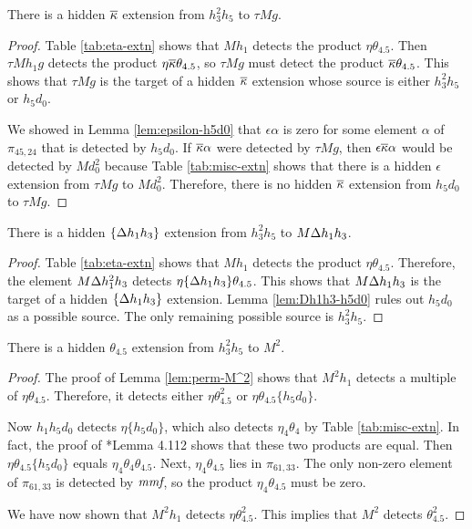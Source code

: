 \begin{lemma}
\label{lem:kappabar-h3^2h5}
There is a hidden $\overline{\kappa}$ extension from $h_3^2 h_5$ to
$\tau M g$.
\end{lemma}

\begin{proof}
Table \ref{tab:eta-extn} shows that
$M h_1$ detects the product $\eta \theta_{4.5}$.
Then $\tau M h_1 g$ detects the product $\eta \overline{\kappa} \theta_{4.5}$,
so $\tau M g$ must detect the product $\overline{\kappa} \theta_{4.5}$.
This shows that $\tau M g$ is the target of a hidden 
$\overline{\kappa}$ extension
whose source is either $h_3^2 h_5$ or $h_5 d_0$.

We showed in Lemma \ref{lem:epsilon-h5d0}
that $\epsilon \alpha$ is zero for some element 
$\alpha$ of $\pi_{45,24}$ that is detected by $h_5 d_0$.
If $\overline{\kappa} \alpha$ were detected by $\tau M g$,
then $\epsilon \overline{\kappa} \alpha$ would be detected by
$M d_0^2$ because Table \ref{tab:misc-extn} shows that
there is a hidden $\epsilon$ extension from $\tau M g$
to $M d_0^2$.
Therefore, there is no hidden $\overline{\kappa}$ extension
from $h_5 d_0$ to $\tau M g$.
\end{proof}

\begin{lemma}
\label{lem:Dh1h3-h3^2h5}
There is a hidden $\{\Delta h_1 h_3\}$ extension from
$h_3^2 h_5$ to $M \Delta h_1 h_3$.
\end{lemma}

\begin{proof}
Table \ref{tab:eta-extn} shows that $M h_1$ detects the product
$\eta \theta_{4.5}$.  Therefore, the element
$M \Delta h_1^2 h_3$ detects $\eta \{\Delta h_1 h_3\} \theta_{4.5}$.
This shows that $M \Delta h_1 h_3$ is the target of a hidden
$\{\Delta h_1 h_3\}$ extension.
Lemma \ref{lem:Dh1h3-h5d0} rules out $h_5 d_0$ as a possible source.
The only remaining possible source is $h_3^2 h_5$.
\end{proof}

\begin{lemma}
\label{lem:theta4.5-h3^2h5}
There is a hidden $\theta_{4.5}$ extension from
$h_3^2 h_5$ to $M^2$.
\end{lemma}

\begin{proof}
The proof of Lemma \ref{lem:perm-M^2} shows that
$M^2 h_1$ detects a multiple of $\eta \theta_{4.5}$.
Therefore, it detects either $\eta \theta_{4.5}^2$
or $\eta \theta_{4.5} \{h_5 d_0\}$.

Now $h_1 h_5 d_0$ detects $\eta \{h_5 d_0\}$, which also
detects $\eta_4 \theta_4$ by Table \ref{tab:misc-extn}.
In fact, the proof of \cite{Isaksen14c}*{Lemma 4.112} shows that
these two products are equal.
Then $\eta \theta_{4.5} \{h_5 d_0\}$ equals
$\eta_4 \theta_4 \theta_{4.5}$.
Next,
$\eta_4 \theta_{4.5}$ lies in $\pi_{61,33}$.
The only non-zero element of $\pi_{61,33}$ is detected by
$\textit{mmf}$, so the product $\eta_4 \theta_{4.5}$ must be zero.

We have now shown that $M^2 h_1$ detects $\eta \theta_{4.5}^2$.
This implies that $M^2$ detects $\theta_{4.5}^2$.
\end{proof}

